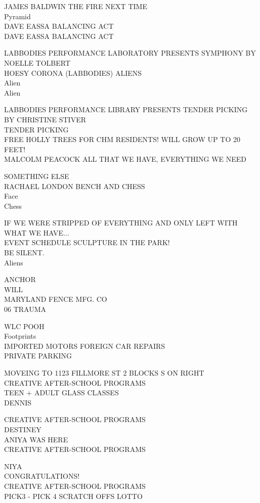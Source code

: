 \documentclass[10pt,letterpaper]{article}
\begin{document}
JAMES BALDWIN THE FIRE NEXT TIME\\
Pyramid\\
DAVE EASSA BALANCING ACT\\
DAVE EASSA BALANCING ACT

LABBODIES PERFORMANCE LABORATORY PRESENTS SYMPHONY BY NOELLE TOLBERT\\
HOESY CORONA (LABBODIES) ALIENS\\
Alien\\
Alien

LABBODIES PERFORMANCE LIBRARY PRESENTS TENDER PICKING BY CHRISTINE STIVER\\
TENDER PICKING\\
FREE HOLLY TREES FOR CHM RESIDENTS!  WILL GROW UP TO 20 FEET!\\
MALCOLM PEACOCK ALL THAT WE HAVE, EVERYTHING WE NEED

SOMETHING ELSE\\
RACHAEL LONDON BENCH AND CHESS\\
Face\\
Chess

IF WE WERE STRIPPED OF EVERYTHING AND ONLY LEFT WITH WHAT WE HAVE...\\
EVENT SCHEDULE SCULPTURE IN THE PARK!\\
BE SILENT.\\
Aliens

ANCHOR\\
WILL\\
MARYLAND FENCE MFG. CO\\
06 TRAUMA

WLC POOH\\
Footprints\\
IMPORTED MOTORS FOREIGN CAR REPAIRS\\
PRIVATE PARKING

MOVEING TO 1123 FILLMORE ST 2 BLOCKS S ON RIGHT\\
CREATIVE AFTER{-}SCHOOL PROGRAMS\\
TEEN + ADULT GLASS CLASSES\\
DENNIS

CREATIVE AFTER{-}SCHOOL PROGRAMS\\
DESTINEY\\
ANIYA WAS HERE\\
CREATIVE AFTER{-}SCHOOL PROGRAMS

NIYA\\
CONGRATULATIONS!\\
CREATIVE AFTER{-}SCHOOL PROGRAMS\\
PICK3 {-} PICK 4 SCRATCH OFFS LOTTO
\end{document}
